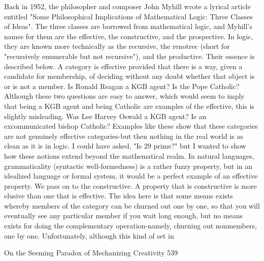         Back in 1952, the philosopher and composer John Myhill wrote a lyrical
article entitled "Some Philosophical Implications of Mathematical Logic: Three
Classes of Ideas". The three classes are borrowed from mathematical logic, and
Myhill's names for them are the effective, the constructive, and the prospective. In
logic, they are known more technically as the recursive, the renotrec (short for
"recursively enumerable but not recursive"), and the productive. Their essence is
described below.
        A category is effective provided that there is a way, given a candidate for
membership, of deciding without any doubt whether that object is or is not a member.
Is Ronald Reagan a KGB agent? Is the Pope Catholic? Although these two questions
are easy to answer, which would seem to imply that being a KGB agent and being
Catholic are examples of the effective, this is slightly misleading. Was Lee Harvey
Oswald a KGB agent? Is an excommunicated bishop Catholic? Examples like these
show that these categories are not genuinely effective categories-but then nothing in
the real world is as clean as it is in logic. I could have asked, "Is 29 prime?" but I
wanted to show how these notions extend beyond the mathematical realm. In natural
languages, grammaticality (syntactic well-formedness) is a rather fuzzy property, but
in an idealized language or formal system, it would be a perfect example of an
effective property.
        We pass on to the constructive. A property that is constructive is more elusive
than one that is effective. The idea here is that some means exists whereby members
of the category can be churned out one by one, so that you will eventually see any
particular member if you wait long enough, but no means exists for doing the
complementary operation-namely, churning out nonmembers, one by one.
Unfortunately, although this kind of set in




On the Seeming Paradox of Mechanizing Creativity                                      539

